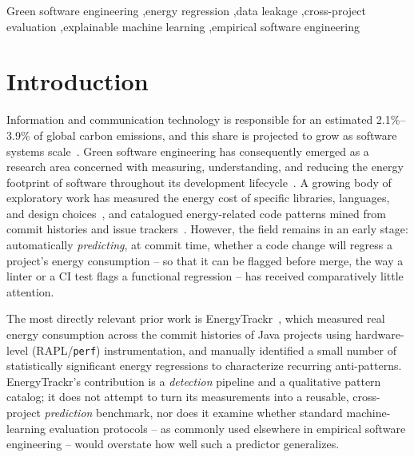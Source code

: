 \documentclass[preprint,12pt]{elsarticle}
\begin{document}
\begin{frontmatter}
\begin{abstract}
\textbf{Conclusion:} We release the benchmark, labeling protocol, and evaluation code, and recommend that project-grouped evaluation, pooled bootstrap significance testing, and label-artifact screening become standard practice for machine-learning-based energy-regression prediction research.
\end{abstract}

\begin{keyword}
Green software engineering \sep energy regression \sep data leakage \sep cross-project evaluation \sep explainable machine learning \sep empirical software engineering
\end{keyword}

\end{frontmatter}

\linenumbers

\section{Introduction}
\label{sec:intro}

Information and communication technology is responsible for an estimated 2.1\%--3.9\% of global carbon emissions, and this share is projected to grow as software systems scale~\citep{green2025llmcode}. Green software engineering has consequently emerged as a research area concerned with measuring, understanding, and reducing the energy footprint of software throughout its development lifecycle~\citep{junger2024greencoding,hindle2014greenminer}. A growing body of exploratory work has measured the energy cost of specific libraries, languages, and design choices~\citep{energyrace2025rpython}, and catalogued energy-related code patterns mined from commit histories and issue trackers~\citep{cruz2019catalog}. However, the field remains in an early stage: automatically \emph{predicting}, at commit time, whether a code change will regress a project's energy consumption -- so that it can be flagged before merge, the way a linter or a CI test flags a functional regression -- has received comparatively little attention.

The most directly relevant prior work is EnergyTrackr~\citep{bechet2026energytrackr}, which measured real energy consumption across the commit histories of Java projects using hardware-level (RAPL/\texttt{perf}) instrumentation, and manually identified a small number of statistically significant energy regressions to characterize recurring anti-patterns. EnergyTrackr's contribution is a \emph{detection} pipeline and a qualitative pattern catalog; it does not attempt to turn its measurements into a reusable, cross-project \emph{prediction} benchmark, nor does it examine whether standard machine-learning evaluation protocols -- as commonly used elsewhere in empirical software engineering -- would overstate how well such a predictor generalizes.
\end{document}
